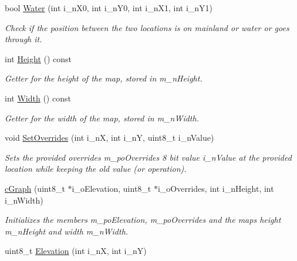 \begin{DoxyCompactItemize}
bool \mbox{\hyperlink{classplanner_1_1c_graph_a99935ff4c32d229e6006aaa843a685a9}{Water}} (int i\+\_\+n\+X0, int i\+\_\+n\+Y0, int i\+\_\+n\+X1, int i\+\_\+n\+Y1)
\begin{DoxyCompactList}\small\item\em Check if the position between the two locations is on mainland or water or goes through it. \end{DoxyCompactList}\item 
int \mbox{\hyperlink{classplanner_1_1c_graph_a5c163af76e19303794a908304f3b759e}{Height}} () const
\begin{DoxyCompactList}\small\item\em Getter for the height of the map, stored in m\+\_\+n\+Height. \end{DoxyCompactList}\item 
int \mbox{\hyperlink{classplanner_1_1c_graph_a25e3f4ee33c86a8a0c3a31c42dac7607}{Width}} () const
\begin{DoxyCompactList}\small\item\em Getter for the width of the map, stored in m\+\_\+n\+Width. \end{DoxyCompactList}\item 
void \mbox{\hyperlink{classplanner_1_1c_graph_a6da6e6e269013628aef48245a7787cb9}{Set\+Overrides}} (int i\+\_\+nX, int i\+\_\+nY, uint8\+\_\+t i\+\_\+n\+Value)
\begin{DoxyCompactList}\small\item\em Sets the provided overrides m\+\_\+po\+Overrides 8 bit value i\+\_\+n\+Value at the provided location while keeping the old value (or operation). \end{DoxyCompactList}\item 
\mbox{\label{classplanner_1_1c_graph_a189aeb64fe91fd6dd07f4b068d3b791e}} 
\mbox{\hyperlink{classplanner_1_1c_graph_a189aeb64fe91fd6dd07f4b068d3b791e}{c\+Graph}} (uint8\+\_\+t $\ast$i\+\_\+o\+Elevation, uint8\+\_\+t $\ast$i\+\_\+o\+Overrides, int i\+\_\+n\+Height, int i\+\_\+n\+Width)
\begin{DoxyCompactList}\small\item\em Initializes the members m\+\_\+po\+Elevation, m\+\_\+po\+Overrides and the maps height m\+\_\+n\+Height and width m\+\_\+n\+Width. \end{DoxyCompactList}\item 
uint8\+\_\+t \mbox{\hyperlink{classplanner_1_1c_graph_a0e01eaa240f5e4f5020df2d611ab1994}{Elevation}} (int i\+\_\+nX, int i\+\_\+nY)

\end{DoxyCompactItemize}
